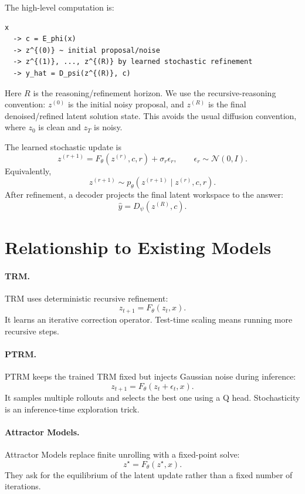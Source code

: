 \documentclass[11pt]{article}
\begin{document}
The high-level computation is:

\begin{lstlisting}
x
  -> c = E_phi(x)
  -> z^{(0)} ~ initial proposal/noise
  -> z^{(1)}, ..., z^{(R)} by learned stochastic refinement
  -> y_hat = D_psi(z^{(R)}, c)
\end{lstlisting}

Here \(R\) is the reasoning/refinement horizon. We use the recursive-reasoning convention: \(z^{(0)}\) is the initial noisy proposal, and \(z^{(R)}\) is the final denoised/refined latent solution state. This avoids the usual diffusion convention, where \(z_0\) is clean and \(z_T\) is noisy.

The learned stochastic update is
\[
    z^{(r+1)}
    =
    F_\theta(z^{(r)},c,r)+\sigma_r\epsilon_r,
    \qquad
    \epsilon_r\sim\mathcal N(0,I).
\]
Equivalently,
\[
    z^{(r+1)}
    \sim
    p_\theta(z^{(r+1)}\mid z^{(r)},c,r).
\]
After refinement, a decoder projects the final latent workspace to the answer:
\[
    \hat y = D_\psi(z^{(R)},c).
\]

\section{Relationship to Existing Models}

\paragraph{TRM.}
TRM uses deterministic recursive refinement:
\[
    z_{t+1}=F_\theta(z_t,x).
\]
It learns an iterative correction operator. Test-time scaling means running more recursive steps.

\paragraph{PTRM.}
PTRM keeps the trained TRM fixed but injects Gaussian noise during inference:
\[
    z_{t+1}=F_\theta(z_t+\epsilon_t,x).
\]
It samples multiple rollouts and selects the best one using a Q head. Stochasticity is an inference-time exploration trick.

\paragraph{Attractor Models.}
Attractor Models replace finite unrolling with a fixed-point solve:
\[
    z^\star = F_\theta(z^\star,x).
\]
They ask for the equilibrium of the latent update rather than a fixed number of iterations.
\end{document}
